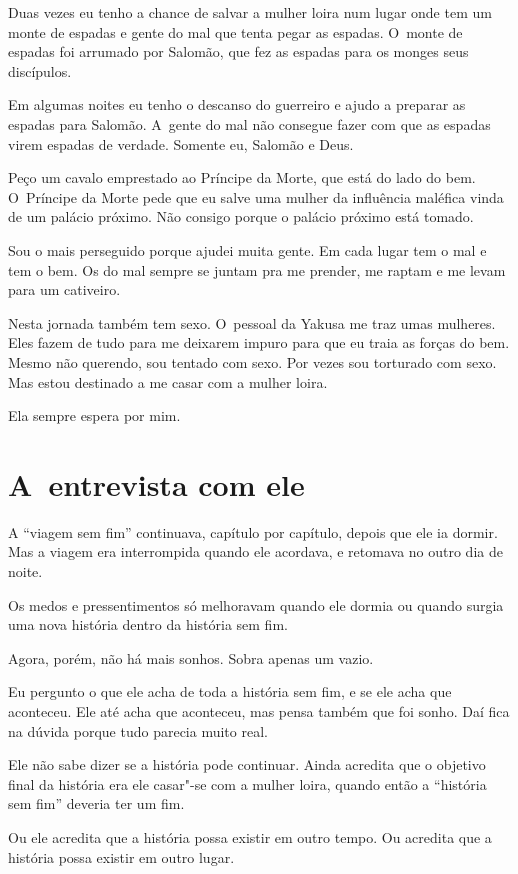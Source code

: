 Duas vezes eu tenho a chance de salvar a mulher loira num lugar onde tem
um monte de espadas e gente do mal que tenta pegar as espadas. O~monte
de espadas foi arrumado por Salomão, que fez as espadas para os monges
seus discípulos.

Em algumas noites eu tenho o descanso do guerreiro e ajudo a preparar as
espadas para Salomão. A~gente do mal não consegue fazer com que as
espadas virem espadas de verdade. Somente eu, Salomão e Deus.

Peço um cavalo emprestado ao Príncipe da Morte, que está do lado do bem.
O~Príncipe da Morte pede que eu salve uma mulher da influência maléfica
vinda de um palácio próximo. Não consigo porque o palácio próximo está
tomado.

Sou o mais perseguido porque ajudei muita gente. Em cada lugar tem o mal
e tem o bem. Os do mal sempre se juntam pra me prender, me raptam e me
levam para um cativeiro.

Nesta jornada também tem sexo. O~pessoal da Yakusa me traz umas
mulheres. Eles fazem de tudo para me deixarem impuro para que eu traia
as forças do bem. Mesmo não querendo, sou tentado com sexo. Por vezes
sou torturado com sexo. Mas estou destinado a me casar com a mulher
loira.

Ela sempre espera por mim.

\section*{A~entrevista com ele}

A ``viagem sem fim'' continuava, capítulo por capítulo, depois que ele
ia dormir. Mas a viagem era interrompida quando ele acordava, e retomava
no outro dia de noite.

Os medos e pressentimentos só melhoravam quando ele dormia ou quando
surgia uma nova história dentro da história sem fim.

Agora, porém, não há mais sonhos. Sobra apenas um vazio.

Eu pergunto o que ele acha de toda a história sem fim, e se ele acha que
aconteceu. Ele até acha que aconteceu, mas pensa também que foi sonho.
Daí fica na dúvida porque tudo parecia muito real.

Ele não sabe dizer se a história pode continuar. Ainda acredita que o
objetivo final da história era ele casar"-se com a mulher loira, quando
então a ``história sem fim'' deveria ter um fim.

Ou ele acredita que a história possa existir em outro tempo. Ou acredita
que a história possa existir em outro lugar.


